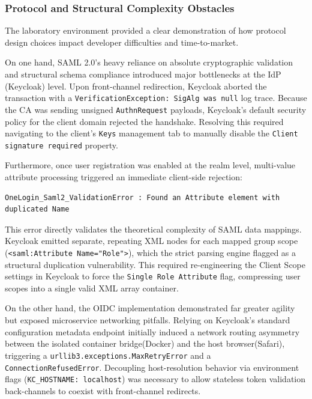 \documentclass[../memoire.tex]{subfiles}
\begin{document}
\subsubsection{Protocol and Structural Complexity Obstacles}

The laboratory environment provided a clear demonstration of how protocol design choices impact developer difficulties and time-to-market. 

On one hand, SAML 2.0's heavy reliance on absolute cryptographic validation and structural schema compliance introduced major bottlenecks at the IdP (Keycloak) level. Upon front-channel redirection, Keycloak aborted the transaction with a \texttt{VerificationException: SigAlg was null} log trace. Because the CA was sending unsigned \texttt{AuthnRequest} payloads, Keycloak's default security policy for the client domain rejected the handshake. Resolving this required navigating to the client’s \texttt{Keys} management tab to manually disable the \texttt{Client signature required} property. 

Furthermore, once user registration was enabled at the realm level, multi-value attribute processing triggered an immediate client-side rejection:
\begin{lstlisting}[basicstyle=\ttfamily, caption={SAML Attribute Mapping Collision}]
OneLogin_Saml2_ValidationError : Found an Attribute element with duplicated Name
\end{lstlisting}
This error directly validates the theoretical complexity of SAML data mappings. Keycloak emitted separate, repeating XML nodes for each mapped group scope (\texttt{<saml:Attribute Name="Role">}), which the strict parsing engine flagged as a structural duplication vulnerability. This required re-engineering the Client Scope settings in Keycloak to force the \texttt{Single Role Attribute} flag, compressing user scopes into a single valid XML array container.

On the other hand, the OIDC implementation demonstrated far greater agility but exposed microservice networking pitfalls. Relying on Keycloak's standard configuration metadata endpoint initially induced a network routing asymmetry between the isolated container bridge(Docker) and the host browser(Safari), triggering a \texttt{urllib3.exceptions.MaxRetryError} and a \texttt{ConnectionRefusedError}. Decoupling host-resolution behavior via environment flags (\texttt{KC\_HOSTNAME: localhost}) was necessary to allow stateless token validation back-channels to coexist with front-channel redirects.
\end{document}
